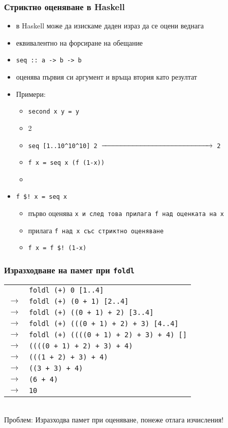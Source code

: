 \documentclass{beamer}
\begin{document}
\begin{frame}
  \frametitle{Стриктно оценяване в Haskell}
  \begin{itemize}[<+->]
  \item в Haskell може да изискаме даден израз да се оцени веднага
  \item еквивалентно на форсиране на обещание
  \item \tt{seq :: a -> b -> b}
  \item оценява първия си аргумент и връща втория като резултат
  \item Примери:
    \begin{itemize}
    \item \tt{second x y = y}
    \item {}2
    \item \tt{seq [1..10\^{}10\^{}10] 2} $\xrightarrow{\hspace{35ex}}$ \tt 2
    \item \tt{f x = seq x (f (1-x))}
    \item {}
    \end{itemize}
  \item \tt{f \$! x = seq x }
    \begin{itemize}
    \item първо оценява \tt x и след това прилага \tt f над оценката на \tt x
    \item прилага \tt f над \tt x със стриктно оценяване
    \item \tt{f x = f \$! (1-x)}
    \end{itemize}
  \end{itemize}
\end{frame}

\begin{frame}
  \frametitle{Изразходване на памет при \tt{foldl}}
  \newcommand{\lra}{\onslide<+->$\longrightarrow$}
  \begin{tabular}{rl}
    &\tt{foldl (+) 0 [1..4]}\\
   \lra&\tt{foldl (+) (0 + 1) [2..4]}\\
   \lra&\tt{foldl (+) ((0 + 1) + 2) [3..4]}\\
   \lra&\tt{foldl (+) (((0 + 1) + 2) + 3) [4..4]}\\
   \lra&\tt{foldl (+) ((((0 + 1) + 2) + 3) + 4) []}\\
   \lra&\tt{((((0 + 1) + 2) + 3) + 4)}\\
   \lra&\tt{(((1 + 2) + 3) + 4)}\\
   \lra&\tt{((3 + 3) + 4)}\\
   \lra&\tt{(6 + 4)}\\
   \lra&\tt{10}
  \end{tabular}\\[2em]
  \onslide<+->
  \alert{Проблем:} Изразходва памет при оценяване, понеже отлага изчисления!
\end{frame}
\end{document}
